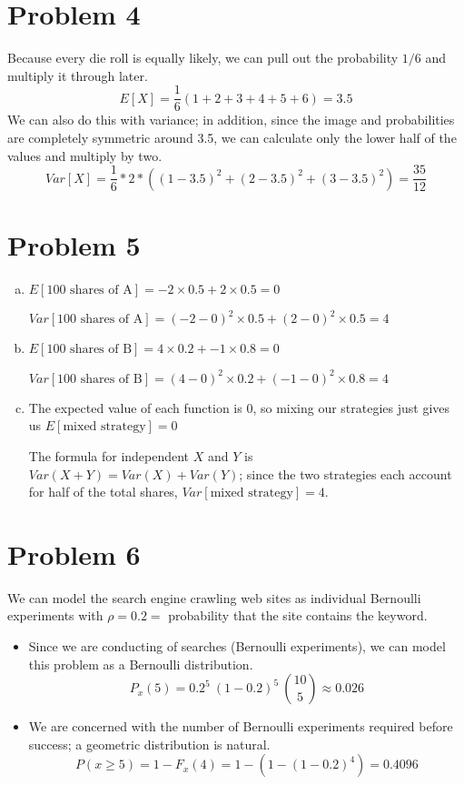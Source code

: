 \documentclass[11pt]{article}
\begin{document}
\section*{Problem 4}
Because every die roll is equally likely, we can pull out the probability $1/6$ and multiply it through later.
	\[E[X] = \dfrac{1}{6}( 1+2+3+4+5+6) = 3.5 \]
We can also do this with variance; in addition, since the image and probabilities are completely symmetric around 3.5, we can calculate only the lower half of the values and multiply by two.
	\[Var[X] = \dfrac{1}{6} * 2 * ( (1-3.5)^2 + (2 - 3.5)^2 + (3-3.5)^2 ) = \dfrac{35}{12} \]
	
\section*{Problem 5}
\begin{enumerate}[(a)]
	\item 
	$E[\text{100 shares of A}] = -2 \times 0.5 + 2 \times 0.5 = 0$
	
	$Var[\text{100 shares of A} ] = (-2 -0)^2  \times 0.5 + (2-0)^2 \times 0.5 = 4$
	
	\item
	$E[\text{100 shares of B}] = 4 \times 0.2 + -1 \times 0.8 = 0$
	
	$Var[\text{100 shares of B}] = (4-0)^2 \times 0.2 + (-1 - 0)^2 \times 0.8 = 4$
	
	\item
	The expected value of each function is 0, so mixing our strategies just gives us $E[\text{mixed strategy}] = 0$
	
	The formula for independent $X$ and $Y$ is $Var(X+Y) = Var(X) +Var(Y)$; since the two strategies each account for half of the total shares, $Var[\text{mixed strategy}] = 4$.

\end{enumerate}


\section*{Problem 6}
We can model the search engine crawling web sites as individual Bernoulli experiments with $\rho = 0.2 = $ probability that the site contains the keyword.
	\begin{itemize}
	\item
	Since we are conducting of searches (Bernoulli experiments), we can model this problem as a Bernoulli distribution. 
	\[ P_x(5) = 0.2^5\ (1-0.2)^5\ \binom{10}{5}  \approx 0.026\]
	
	\item 
	We are concerned with the number of Bernoulli experiments required before success; a geometric distribution is natural.
	\[P(x \ge 5) = 1- F_x(4) = 1 -(1- (1-0.2)^4) = 0.4096 \]
	
	\end{itemize}
\end{document}
